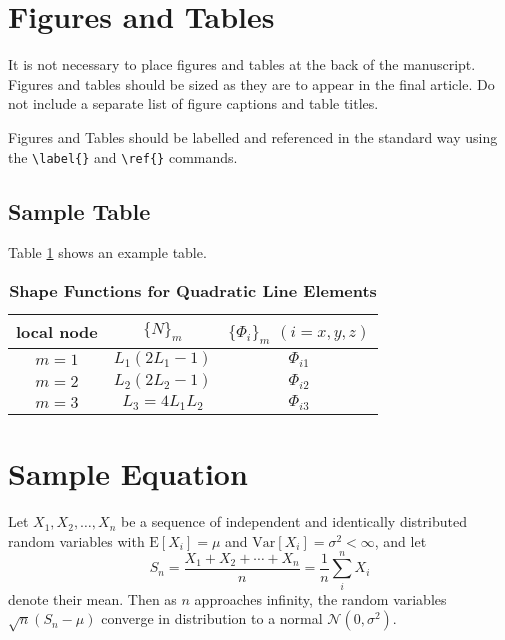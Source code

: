 \documentclass[9pt,twocolumn,twoside]{optica}
\begin{document}
\section{Figures and Tables}

It is not necessary to place figures and tables at the back of the manuscript. Figures and tables should be sized as they are to appear in the final article. Do not include a separate list of figure captions and table titles.

Figures and Tables should be labelled and referenced in the standard way using the \verb|\label{}| and \verb|\ref{}| commands.



\subsection{Sample Table}

Table \ref{tab:shape-functions} shows an example table. 

\begin{table}[htbp]
\centering
\caption{\bf Shape Functions for Quadratic Line Elements}
\begin{tabular}{ccc}
\hline
local node & $\{N\}_m$ & $\{\Phi_i\}_m$ $(i=x,y,z)$ \\
\hline
$m = 1$ & $L_1(2L_1-1)$ & $\Phi_{i1}$ \\
$m = 2$ & $L_2(2L_2-1)$ & $\Phi_{i2}$ \\
$m = 3$ & $L_3=4L_1L_2$ & $\Phi_{i3}$ \\
\hline
\end{tabular}
  \label{tab:shape-functions}
\end{table}





\section{Sample Equation}

Let $X_1, X_2, \ldots, X_n$ be a sequence of independent and identically distributed random variables with $\text{E}[X_i] = \mu$ and $\text{Var}[X_i] = \sigma^2 < \infty$, and let
\begin{equation}
S_n = \frac{X_1 + X_2 + \cdots + X_n}{n}
      = \frac{1}{n}\sum_{i}^{n} X_i
\label{eq:refname1}
\end{equation}
denote their mean. Then as $n$ approaches infinity, the random variables $\sqrt{n}(S_n - \mu)$ converge in distribution to a normal $\mathcal{N}(0, \sigma^2)$.
\end{document}
